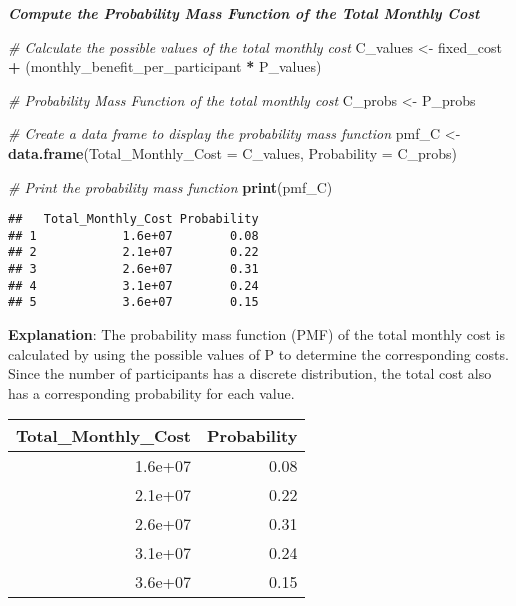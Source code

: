 \documentclass[
  11pt,
]{article}
\newenvironment{Shaded}{\begin{snugshade}}{\end{snugshade}}
\newcommand{\AttributeTok}[1]{\textcolor[rgb]{0.13,0.29,0.53}{#1}}
\newcommand{\CommentTok}[1]{\textcolor[rgb]{0.56,0.35,0.01}{\textit{#1}}}
\newcommand{\FunctionTok}[1]{\textcolor[rgb]{0.13,0.29,0.53}{\textbf{#1}}}
\newcommand{\NormalTok}[1]{#1}
\newcommand{\OtherTok}[1]{\textcolor[rgb]{0.56,0.35,0.01}{#1}}
\newcommand{\SpecialCharTok}[1]{\textcolor[rgb]{0.81,0.36,0.00}{\textbf{#1}}}
\begin{document}
\textbf{\emph{Compute the Probability Mass Function of the Total Monthly
Cost}}

\begin{Shaded}
\begin{Highlighting}[]
\CommentTok{\# Calculate the possible values of the total monthly cost}
\NormalTok{C\_values }\OtherTok{\textless{}{-}}\NormalTok{ fixed\_cost }\SpecialCharTok{+}\NormalTok{ (monthly\_benefit\_per\_participant }\SpecialCharTok{*}\NormalTok{ P\_values)}

\CommentTok{\# Probability Mass Function of the total monthly cost}
\NormalTok{C\_probs }\OtherTok{\textless{}{-}}\NormalTok{ P\_probs}

\CommentTok{\# Create a data frame to display the probability mass function}
\NormalTok{pmf\_C }\OtherTok{\textless{}{-}} \FunctionTok{data.frame}\NormalTok{(}\AttributeTok{Total\_Monthly\_Cost =}\NormalTok{ C\_values, }\AttributeTok{Probability =}\NormalTok{ C\_probs)}

\CommentTok{\# Print the probability mass function}
\FunctionTok{print}\NormalTok{(pmf\_C)}
\end{Highlighting}
\end{Shaded}

\begin{verbatim}
##   Total_Monthly_Cost Probability
## 1            1.6e+07        0.08
## 2            2.1e+07        0.22
## 3            2.6e+07        0.31
## 4            3.1e+07        0.24
## 5            3.6e+07        0.15
\end{verbatim}

\textbf{Explanation}: The probability mass function (PMF) of the total
monthly cost is calculated by using the possible values of P to
determine the corresponding costs. Since the number of participants has
a discrete distribution, the total cost also has a corresponding
probability for each value.

\begin{center}
\begin{tabular}{r|r}
\hline
Total\_Monthly\_Cost & Probability\\
\hline
1.6e+07 & 0.08\\
\hline
2.1e+07 & 0.22\\
\hline
2.6e+07 & 0.31\\
\hline
3.1e+07 & 0.24\\
\hline
3.6e+07 & 0.15\\
\hline
\end{tabular}
\end{center}
\end{document}
